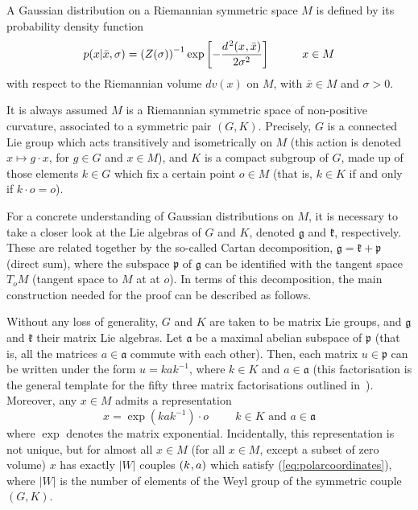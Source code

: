 \documentclass[draftclsnofoot]{IEEEtran}
\begin{document}
A Gaussian distribution on a Riemannian symmetric space $M$ is defined by its probability density function
\begin{equation} \label{eq:symspace_gdensity}
 p(x|\bar{x},\sigma) = \left(Z(\sigma)\right)^{-1}\exp\left[-\frac{d^{\hspace{0.03cm} 2}(x\hspace{0.02cm},\bar{x})}{2\sigma^2}\right] \hspace{1cm} x \in M
\end{equation}
with respect to the Riemannian volume $dv(x)$ on $M$, with $\bar{x} \in M$ and $\sigma > 0$. 

It is always assumed $M$ is a Riemannian symmetric space of non-positive curvature, associated to a symmetric pair $(G,K)$. Precisely, $G$ is a connected Lie group which acts transitively and isometrically on $M$ (this action is denoted $x \mapsto g\cdot x$, for $g \in G$ and $x \in M$), and $K$ is a compact subgroup of $G$, made up of those elements $k \in G$ which fix a certain point $o \in M$ (that is, $k \in K$ if and only if $k\cdot o = o$). %

For a concrete understanding of Gaussian distributions on $M$, it is necessary to take a closer look at the Lie algebras of $G$ and $K$, denoted $\mathfrak{g}$ and $\mathfrak{k}$, respectively. These are related together by the so-called Cartan decomposition, $\mathfrak{g} = \mathfrak{k} + \mathfrak{p}$ (direct sum), where the subspace $\mathfrak{p}$ of $\mathfrak{g}$ can be identified with the tangent space $T_oM$ (tangent space to $M$ at at $o$). In terms of this decomposition, the main construction needed for the proof can be described as follows. 

Without any loss of generality, $G$ and $K$ are taken to be matrix Lie groups, and $\mathfrak{g}$ and $\mathfrak{k}$ their matrix Lie algebras. Let $\mathfrak{a}$ be a maximal abelian subspace of $\mathfrak{p}$ (that is, all the matrices $a \in \mathfrak{a}$ commute with each other). Then, each matrix $u \in \mathfrak{p}$ can be written under the form $u = k a k^{-1}$, where $k \in K$ and $a \in \mathfrak{a}$ (this factorisation is the general template for the fifty three matrix factorisations outlined in~\cite{edelman}). Moreover, any $x \in M$ admits a representation
\begin{equation}\label{eq:polarcoordinates}
  x = \exp\left(k a k^{-1}\right)\cdot o \hspace{1cm} k \in K \text{ and } a \in \mathfrak{a}
\end{equation}
where $\exp$ denotes the matrix exponential. Incidentally, this representation is not unique, but for almost all $x \in M$ (for all $x \in M$, except a subset of zero volume) $x$ has exactly $|W|$ couples $(k\hspace{0.02cm},a)$ which satisfy (\ref{eq:polarcoordinates}), where $|W|$ is the number of elements of the Weyl group of the symmetric couple $(G,K)$. 
\end{document}
